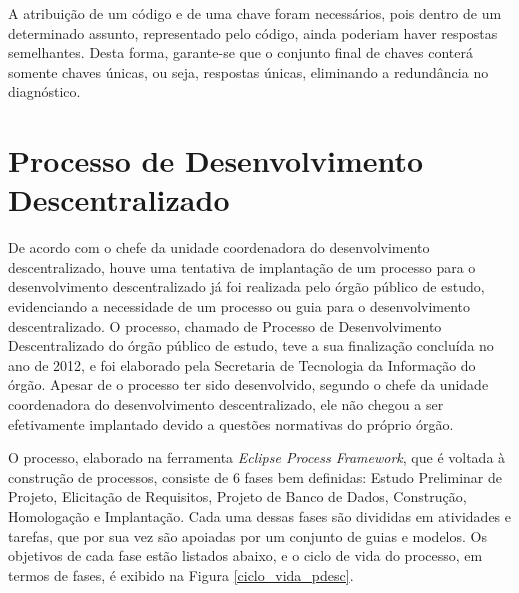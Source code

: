 A atribuição de um código e de uma chave foram necessários, pois dentro de um determinado assunto, representado pelo código, ainda poderiam haver respostas semelhantes. Desta forma, garante-se que o conjunto final de chaves conterá somente chaves únicas, ou seja, respostas únicas, eliminando a redundância no diagnóstico.
\clearpage

\section{Processo de Desenvolvimento Descentralizado}

De acordo com o chefe da unidade coordenadora do desenvolvimento descentralizado, houve uma tentativa de implantação de um processo para o desenvolvimento descentralizado já foi realizada pelo órgão público de estudo, evidenciando a necessidade de um processo ou guia para o desenvolvimento descentralizado. O processo, chamado de Processo de Desenvolvimento Descentralizado do órgão público de estudo, teve a sua finalização concluída no ano de 2012, e foi elaborado pela Secretaria de Tecnologia da Informação do órgão. Apesar de o processo ter sido desenvolvido, segundo o chefe da unidade coordenadora do desenvolvimento descentralizado, ele não chegou a ser efetivamente implantado devido a questões normativas do próprio órgão.

O processo, elaborado na ferramenta \textit{Eclipse Process Framework}, que é voltada à construção de processos, consiste de 6 fases bem definidas: Estudo Preliminar de Projeto, Elicitação de Requisitos, Projeto de Banco de Dados, Construção, Homologação e Implantação. Cada uma dessas fases são divididas em atividades e tarefas, que por sua vez são apoiadas por um conjunto de guias e modelos. Os objetivos de cada fase estão listados abaixo, e o ciclo de vida do processo, em termos de fases, é exibido na Figura \ref{ciclo_vida_pdesc}.

